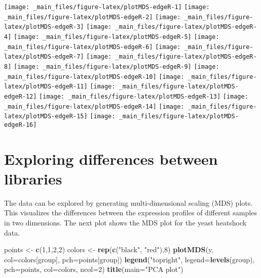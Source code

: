 \documentclass[
]{book}
\newenvironment{Shaded}{\begin{snugshade}}{\end{snugshade}}
\newcommand{\AttributeTok}[1]{\textcolor[rgb]{0.13,0.29,0.53}{#1}}
\newcommand{\DecValTok}[1]{\textcolor[rgb]{0.00,0.00,0.81}{#1}}
\newcommand{\FunctionTok}[1]{\textcolor[rgb]{0.13,0.29,0.53}{\textbf{#1}}}
\newcommand{\NormalTok}[1]{#1}
\newcommand{\OtherTok}[1]{\textcolor[rgb]{0.56,0.35,0.01}{#1}}
\newcommand{\StringTok}[1]{\textcolor[rgb]{0.31,0.60,0.02}{#1}}
\begin{document}
\texttt{[image: \_main\_files/figure-latex/plotMDS-edgeR-1]} \texttt{[image: \_main\_files/figure-latex/plotMDS-edgeR-2]} \texttt{[image: \_main\_files/figure-latex/plotMDS-edgeR-3]} \texttt{[image: \_main\_files/figure-latex/plotMDS-edgeR-4]} \texttt{[image: \_main\_files/figure-latex/plotMDS-edgeR-5]} \texttt{[image: \_main\_files/figure-latex/plotMDS-edgeR-6]} \texttt{[image: \_main\_files/figure-latex/plotMDS-edgeR-7]} \texttt{[image: \_main\_files/figure-latex/plotMDS-edgeR-8]} \texttt{[image: \_main\_files/figure-latex/plotMDS-edgeR-9]} \texttt{[image: \_main\_files/figure-latex/plotMDS-edgeR-10]} \texttt{[image: \_main\_files/figure-latex/plotMDS-edgeR-11]} \texttt{[image: \_main\_files/figure-latex/plotMDS-edgeR-12]} \texttt{[image: \_main\_files/figure-latex/plotMDS-edgeR-13]} \texttt{[image: \_main\_files/figure-latex/plotMDS-edgeR-14]} \texttt{[image: \_main\_files/figure-latex/plotMDS-edgeR-15]} \texttt{[image: \_main\_files/figure-latex/plotMDS-edgeR-16]}

\hypertarget{exploring-differences-between-libraries}{%
\section{Exploring differences between libraries}\label{exploring-differences-between-libraries}}

The data can be explored by generating multi-dimensional scaling (MDS)
plots. This visualizes the differences between the expression profiles
of different samples in two dimensions. The next plot shows the MDS plot
for the yeast heatshock data.

\begin{Shaded}
\begin{Highlighting}[]
\NormalTok{points }\OtherTok{\textless{}{-}} \FunctionTok{c}\NormalTok{(}\DecValTok{1}\NormalTok{,}\DecValTok{1}\NormalTok{,}\DecValTok{2}\NormalTok{,}\DecValTok{2}\NormalTok{)}
\NormalTok{colors }\OtherTok{\textless{}{-}} \FunctionTok{rep}\NormalTok{(}\FunctionTok{c}\NormalTok{(}\StringTok{"black"}\NormalTok{, }\StringTok{"red"}\NormalTok{),}\DecValTok{8}\NormalTok{)}
\FunctionTok{plotMDS}\NormalTok{(y, }\AttributeTok{col=}\NormalTok{colors[group], }\AttributeTok{pch=}\NormalTok{points[group])}
\FunctionTok{legend}\NormalTok{(}\StringTok{"topright"}\NormalTok{, }\AttributeTok{legend=}\FunctionTok{levels}\NormalTok{(group),}
     \AttributeTok{pch=}\NormalTok{points, }\AttributeTok{col=}\NormalTok{colors, }\AttributeTok{ncol=}\DecValTok{2}\NormalTok{)}
\FunctionTok{title}\NormalTok{(}\AttributeTok{main=}\StringTok{"PCA plot"}\NormalTok{)}
\end{Highlighting}
\end{Shaded}
\end{document}
